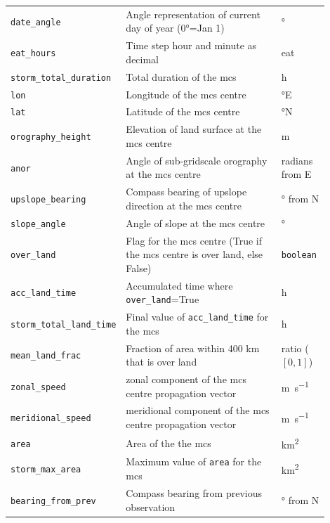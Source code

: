 {\begin{longtable}{>{\raggedright\arraybackslash}p{0.25\linewidth} p{0.50\linewidth} >{\raggedright\arraybackslash}p{0.15\linewidth}}
    \multicolumn{3}{c}{\textit{Geographic and temporal features}} \\
    \midrule
    \texttt{date\_angle} & Angle representation of current day of year (\ang{0}=Jan 1) & \unit{\degree} \\
    \texttt{eat\_hours} & Time step hour and minute as decimal & \acrlong{eat} \\
    \texttt{storm\_total\_duration} & Total duration of the \acrshort{mcs} & \unit{\hour} \\
    \texttt{lon} & Longitude of the \acrshort{mcs} centre & \unit{\degree}E \\
    \texttt{lat} & Latitude of the \acrshort{mcs} centre & \unit{\degree}N \\
    \texttt{orography\_height} & Elevation of land surface at the \acrshort{mcs} centre & \unit{\meter} \\
    \texttt{anor} & Angle of sub-gridscale orography at the \acrshort{mcs} centre & radians from E \\
    \texttt{upslope\_bearing} & Compass bearing of upslope direction at the \acrshort{mcs} centre & \unit{\degree} from  N \\
    \texttt{slope\_angle} & Angle of slope at the \acrshort{mcs} centre & \unit{\degree} \\
    \texttt{over\_land} & Flag for the \acrshort{mcs} centre (True if the \acrshort{mcs} centre is over land, else False) & \texttt{boolean} \\
    \texttt{acc\_land\_time} & Accumulated time where \texttt{over\_land}=True & \unit{\hour} \\
    \texttt{storm\_total\_land\_time} & Final value of \texttt{acc\_land\_time} for the \acrshort{mcs} & \unit{\hour} \\
    \texttt{mean\_land\_frac} & Fraction of area within 400 km that is over land & ratio ($[0,1]$) \\
    \texttt{zonal\_speed} & zonal component of the \acrshort{mcs} centre propagation vector & \unit{\meter\per\second} \\
    \texttt{meridional\_speed} & meridional component of the \acrshort{mcs} centre propagation vector & \unit{\meter\per\second} \\
    \texttt{area} & Area of the the \acrshort{mcs} & \unit{\km\squared} \\
    \texttt{storm\_max\_area} & Maximum value of \texttt{area} for the \acrshort{mcs} & \unit{\km\squared} \\
    \texttt{bearing\_from\_prev} & Compass bearing from previous observation & \unit{\degree} from  N \\

\end{longtable}}
